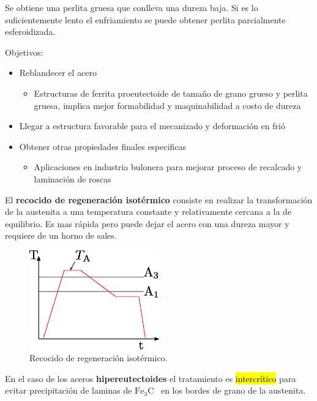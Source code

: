 \documentclass{article}
\newcommand{\cementita}{\ensuremath{\mathrm{Fe}_3 \mathrm{C}}}
\begin{document}
Se obtiene una perlita gruesa que conlleva una dureza baja. Si es lo suficientemente lento el enfriamiento se puede obtener perlita parcialmente esferoidizada.

Objetivos:
\begin{itemize}
    \item Reblandecer el acero
    \begin{itemize}
        \item Estructuras de ferrita proeutectoide de tamaño de grano grueso y perlita gruesa, implica mejor formabilidad y maquinabilidad a costo de dureza
    \end{itemize}
    \item Llegar a estructura favorable para el mecanizado y deformación en frió
    \item Obtener otras propiedades finales especificas
    \begin{itemize}
        \item Aplicaciones en industria bulonera para mejorar proceso de recalcado y laminación de roscas
    \end{itemize}
\end{itemize}

El \textbf{recocido de regeneración isotérmico} consiste en realizar la transformación de la austenita a una temperatura constante y relativamente cercana a la de equilibrio. Es mas rápida pero puede dejar el acero con una dureza mayor y requiere de un horno de sales.

\begin{figure}[htb!]
    \centering
    \includegraphics[width=0.5\textwidth]{fig/TTrecoregiso.eps}
    \caption{Recocido de regeneración isotérmico.}
    \label{fig:TTTrecocidoregeneracionisotermico}
\end{figure}

En el caso de los aceros \textbf{hipereutectoides} el tratamiento es \hl{intercrítico} para evitar precipitación de laminas de \cementita~ en los bordes de grano de la austenita.
\end{document}
